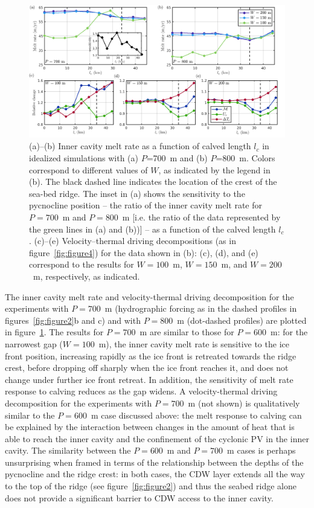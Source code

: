 \documentclass[draft]{agujournal2019}
\begin{document}
\begin{figure}
    \centering
    \includegraphics[width = \textwidth]{../make_figures/plots/figure8.png}
    \caption{(a)--(b) Inner cavity melt rate as a function of calved length $l_c$ in idealized simulations with (a) $P$=700~m and (b) $P$=800~m. Colors correspond to different values of $W$, as indicated by the legend in (b). The black dashed line indicates the location of the crest of the sea-bed ridge. The inset in (a) shows the sensitivity to the pycnocline position -- the ratio of the inner cavity melt rate for $P = 700$~m and $P = 800$~m [i.e. the ratio of the data represented by the green lines in (a) and (b))] -- as a function of the calved length $l_c$. (c)--(e) Velocity--thermal driving decompositions (as in figure~\ref{fig:figure4}) for the data shown in (b): (c), (d), and (e) correspond to the results for $W=100$~m, $W=150$~m, and $W=200$~m, respectively, as indicated.}
    \label{fig:figure8}
\end{figure}


The inner cavity melt rate and velocity-thermal driving decomposition for the experiments with $P=700$~m (hydrographic forcing as in the dashed profiles in figures~\ref{fig:figure2}b and c) and with $P=800$~m (dot-dashed profiles) are plotted in figure~\ref{fig:figure8}. The results for $P=700$~m are similar to those for $P=600$~m: for the narrowest gap ($W=100$~m), the inner cavity melt rate is sensitive to the ice front position, increasing rapidly as the ice front is retreated towards the ridge crest, before dropping off sharply when the ice front reaches it, and does not change under further ice front retreat. In addition, the sensitivity of melt rate response to calving reduces as the gap widens. A velocity-thermal driving decomposition for the experiments with $P=700$~m (not shown) is qualitatively similar to the $P=600$~m case discussed above: the melt response to calving can be explained by the interaction between changes in the amount of heat that is able to reach the inner cavity and the confinement of the cyclonic PV in the inner cavity. The similarity between the $P=600$~m and $P=700$~m cases is perhaps unsurprising when framed in terms of the relationship between the depths of the pycnocline and the ridge crest: in both cases, the CDW layer extends all the way to the top of the ridge (see figure~\ref{fig:figure2}) and thus the seabed ridge alone does not provide a significant barrier to CDW access to the inner cavity.
\end{document}
